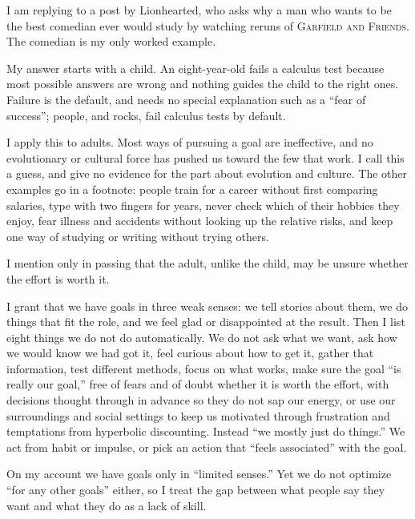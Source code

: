 
I am replying to a post by Lionhearted, who asks why a man who wants to be the best comedian ever would study by watching reruns of \textsc{Garfield and Friends}. The comedian is my only worked example.

My answer starts with a child. An eight-year-old fails a calculus test because most possible answers are wrong and nothing guides the child to the right ones. Failure is the default, and needs no special explanation such as a ``fear of success''; people, and rocks, fail calculus tests by default.

I apply this to adults. Most ways of pursuing a goal are ineffective, and no evolutionary or cultural force has pushed us toward the few that work. I call this a guess, and give no evidence for the part about evolution and culture. The other examples go in a footnote: people train for a career without first comparing salaries, type with two fingers for years, never check which of their hobbies they enjoy, fear illness and accidents without looking up the relative risks, and keep one way of studying or writing without trying others.

I mention only in passing that the adult, unlike the child, may be unsure whether the effort is worth it. 

I grant that we have goals in three weak senses: we tell stories about them, we do things that fit the role, and we feel glad or disappointed at the result. Then I list eight things we do not do automatically. We do not ask what we want, ask how we would know we had got it, feel curious about how to get it, gather that information, test different methods, focus on what works, make sure the goal ``is really our goal,'' free of fears and of doubt whether it is worth the effort, with decisions thought through in advance so they do not sap our energy, or use our surroundings and social settings to keep us motivated through frustration and temptations from hyperbolic discounting. Instead ``we mostly just do things.'' We act from habit or impulse, or pick an action that ``feels associated'' with the goal.

 On my account we have goals only in ``limited senses.'' Yet we do not optimize ``for any other goals'' either, so I treat the gap between what people say they want and what they do as a lack of skill.

